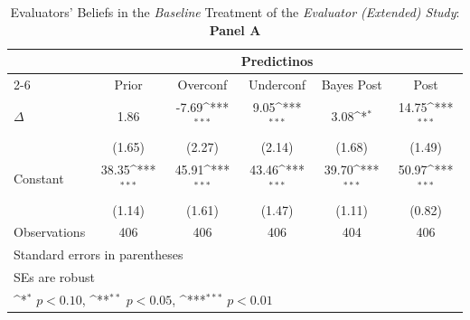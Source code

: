 \begin{table}[htbp]\centering
\def\sym#1{\ifmmode^{#1}\else\(^{#1}\)\fi}
\caption{Evaluators' Beliefs in the \textit{Baseline} Treatment of the \textit{Evaluator (Extended) Study}: \textbf{Panel A}}
\begin{tabular}{l*{5}{c}}
\hline\hline
                &\multicolumn{5}{c}{Predictinos}                                                               \\\cmidrule(lr){2-6}
                &\multicolumn{1}{c}{Prior}&\multicolumn{1}{c}{Overconf}&\multicolumn{1}{c}{Underconf}&\multicolumn{1}{c}{Bayes Post}&\multicolumn{1}{c}{Post}\\
\hline
$\Delta$        &     1.86         &    -7.69\sym{***}&     9.05\sym{***}&     3.08\sym{*}  &    14.75\sym{***}\\
                &   (1.65)         &   (2.27)         &   (2.14)         &   (1.68)         &   (1.49)         \\
Constant        &    38.35\sym{***}&    45.91\sym{***}&    43.46\sym{***}&    39.70\sym{***}&    50.97\sym{***}\\
                &   (1.14)         &   (1.61)         &   (1.47)         &   (1.11)         &   (0.82)         \\
\hline
Observations    &      406         &      406         &      406         &      404         &      406         \\
\hline\hline
\multicolumn{6}{l}{\footnotesize Standard errors in parentheses}\\
\multicolumn{6}{l}{\footnotesize SEs are robust}\\
\multicolumn{6}{l}{\footnotesize \sym{*} \(p<0.10\), \sym{**} \(p<0.05\), \sym{***} \(p<0.01\)}\\
\end{tabular}
\end{table}
